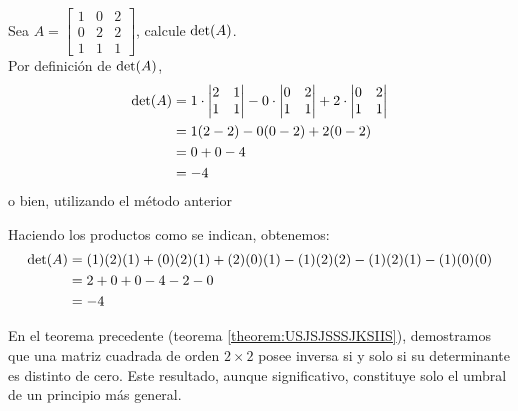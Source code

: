 \begin{example}
    Sea $A=\begin{bmatrix}
        1 & 0 & 2 \\
        0 & 2 & 2 \\
        1 & 1 & 1
    \end{bmatrix}$, calcule $\operatorname{det}(A)$. \\
    \solucion Por definición de $\operatorname{det}(A)$,
    \begin{align*}
        \operatorname{det}(A) & = 1 \cdot \begin{vmatrix}
            2 & 1 \\
            1 & 1
        \end{vmatrix} - 0 \cdot \begin{vmatrix}
            0 & 2 \\
            1 & 1
        \end{vmatrix} + 2 \cdot \begin{vmatrix}
            0 & 2 \\
            1 & 1
        \end{vmatrix} \\
        & = 1(2-2) - 0(0-2) + 2(0-2) \\
        & = 0 + 0 - 4 \\
        & = -4
    \end{align*}
    o bien, utilizando el método anterior
    \begin{center}
    \end{center}
    Haciendo los productos como se indican, obtenemos:
    \begin{align*}
        \operatorname{det}(A) & = (1)(2)(1) + (0)(2)(1) + (2)(0)(1) - (1)(2)(2) - (1)(2)(1) - (1)(0)(0) \\
        & = 2 + 0 + 0 - 4 -2 - 0 \\
        & = -4
    \end{align*}
\end{example}

En el teorema precedente (teorema \ref{theorem:USJSJSSSJKSIIS}), demostramos que una matriz cuadrada de orden $2 \times 2$ posee inversa si y solo si su determinante es distinto de cero. Este resultado, aunque significativo, constituye solo el umbral de un principio más general.

